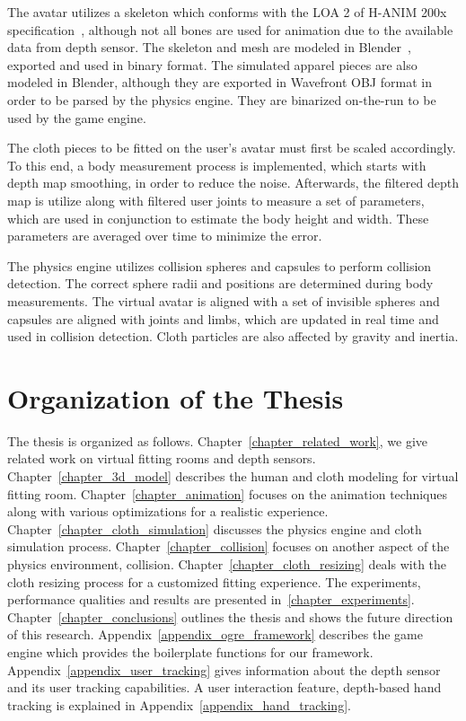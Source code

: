 The avatar utilizes a skeleton which conforms with the LOA 2 of H-ANIM 200x specification~\cite{HANIM}, although not all bones are used for animation due to the available data from depth sensor. The skeleton and mesh are modeled in Blender~\cite{Blender}, exported and used in binary format. The simulated apparel pieces are also modeled in Blender, although they are exported in Wavefront OBJ format in order to be parsed by the physics engine. They are binarized on-the-run to be used by the game engine. 

The cloth pieces to be fitted on the user's avatar must first be scaled accordingly. To this end, a body measurement process is implemented, which starts with depth map smoothing, in order to reduce the noise. Afterwards, the filtered depth map is utilize along with filtered user joints to measure a set of parameters, which are used in conjunction to estimate the body height and width. These parameters are averaged over time to minimize the error.

The physics engine utilizes collision spheres and capsules to perform collision detection. The correct sphere radii and positions are determined during body measurements. The virtual avatar is aligned with a set of invisible spheres and capsules are aligned with joints and limbs, which are updated in real time and used in collision detection. Cloth particles are also affected by gravity and inertia.


\section{Organization of the Thesis}

The thesis is organized as follows. Chapter~\ref{chapter_related_work}, we give related work on virtual fitting rooms and 
depth sensors. Chapter~\ref{chapter_3d_model} describes the human and cloth modeling for virtual fitting room. Chapter~\ref{chapter_animation} focuses on the animation techniques along with various optimizations for a realistic experience. Chapter~\ref{chapter_cloth_simulation} discusses the physics engine and cloth simulation process. Chapter~\ref{chapter_collision} focuses on another aspect of the physics environment, collision. Chapter~\ref{chapter_cloth_resizing} deals with the cloth resizing process for a customized fitting experience. The experiments, performance qualities and results are presented in~\ref{chapter_experiments}. Chapter~\ref{chapter_conclusions} outlines the thesis and shows the future direction of this research. Appendix~\ref{appendix_ogre_framework} describes the game engine which provides the boilerplate functions for our framework. Appendix~\ref{appendix_user_tracking} gives information about the depth sensor and its user tracking capabilities. A user interaction feature, depth-based hand tracking is explained in Appendix~\ref{appendix_hand_tracking}.
